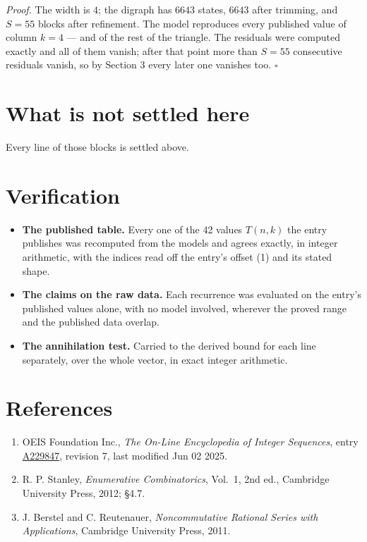 \documentclass[11pt]{article}
\theoremstyle{definition}
\begin{document}
{\itshape Proof.} The width is $4$; the digraph has $6643$ states, $6643$ after trimming, and $S = 55$ blocks after refinement. The model reproduces every published value of column $k = 4$ --- and of the rest of the triangle. The residuals were computed exactly and all of them vanish; after that point more than $S = 55$ consecutive residuals vanish, so by Section 3 every later one vanishes too. $\square$

\section{What is not settled here}

Every line of those blocks is settled above.

\section{Verification}

\begin{itemize}

\item {\bfseries The published table.} Every one of the 42 values $T(n,k)$ the entry publishes was recomputed from the models and agrees exactly, in integer arithmetic, with the indices read off the entry's offset (1) and its stated shape.

\item {\bfseries The claims on the raw data.} Each recurrence was evaluated on the entry's published values alone, with no model involved, wherever the proved range and the published data overlap.

\item {\bfseries The annihilation test.} Carried to the derived bound for each line separately, over the whole vector, in exact integer arithmetic.

\end{itemize}

\section{References}

\begin{enumerate}

\item OEIS Foundation Inc., \emph{The On-Line Encyclopedia of Integer Sequences}, entry \href{https://oeis.org/A229847}{A229847}, revision 7, last modified Jun 02 2025.

\item R. P. Stanley, \emph{Enumerative Combinatorics}, Vol.~1, 2nd ed., Cambridge University Press, 2012; \S4.7.

\item J. Berstel and C. Reutenauer, \emph{Noncommutative Rational Series with Applications}, Cambridge University Press, 2011.

\end{enumerate}
\end{document}
